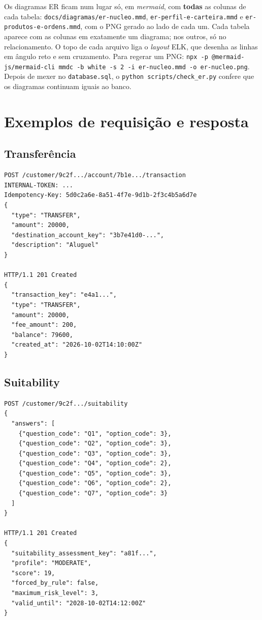 \documentclass[11pt,a4paper]{article}
\newcommand{\tb}[1]{\texttt{#1}}           %
\begin{document}
Os diagramas ER ficam num lugar só, em \emph{mermaid}, com \textbf{todas} as colunas de cada tabela:
\tb{docs/diagramas/er-nucleo.mmd}, \tb{er-perfil-e-carteira.mmd} e \tb{er-produtos-e-ordens.mmd},
com o PNG gerado ao lado de cada um. Cada tabela aparece com as colunas em exatamente um diagrama;
nos outros, só no relacionamento. O topo de cada arquivo liga o \emph{layout} ELK, que desenha as
linhas em ângulo reto e sem cruzamento. Para regerar um PNG:
\tb{npx -p @mermaid-js/mermaid-cli mmdc -b white -s 2 -i er-nucleo.mmd -o er-nucleo.png}. Depois de mexer no \tb{database.sql}, o
\tb{python scripts/check_er.py} confere que os diagramas continuam iguais ao banco.

\section{Exemplos de requisição e resposta}

\subsection*{Transferência}
\begin{lstlisting}
POST /customer/9c2f.../account/7b1e.../transaction
INTERNAL-TOKEN: ...
Idempotency-Key: 5d0c2a6e-8a51-4f7e-9d1b-2f3c4b5a6d7e
{
  "type": "TRANSFER",
  "amount": 20000,
  "destination_account_key": "3b7e41d0-...",
  "description": "Aluguel"
}

HTTP/1.1 201 Created
{
  "transaction_key": "e4a1...",
  "type": "TRANSFER",
  "amount": 20000,
  "fee_amount": 200,
  "balance": 79600,
  "created_at": "2026-10-02T14:10:00Z"
}
\end{lstlisting}

\subsection*{Suitability}
\begin{lstlisting}
POST /customer/9c2f.../suitability
{
  "answers": [
    {"question_code": "Q1", "option_code": 3},
    {"question_code": "Q2", "option_code": 3},
    {"question_code": "Q3", "option_code": 3},
    {"question_code": "Q4", "option_code": 2},
    {"question_code": "Q5", "option_code": 3},
    {"question_code": "Q6", "option_code": 2},
    {"question_code": "Q7", "option_code": 3}
  ]
}

HTTP/1.1 201 Created
{
  "suitability_assessment_key": "a81f...",
  "profile": "MODERATE",
  "score": 19,
  "forced_by_rule": false,
  "maximum_risk_level": 3,
  "valid_until": "2028-10-02T14:12:00Z"
}
\end{lstlisting}
\end{document}
